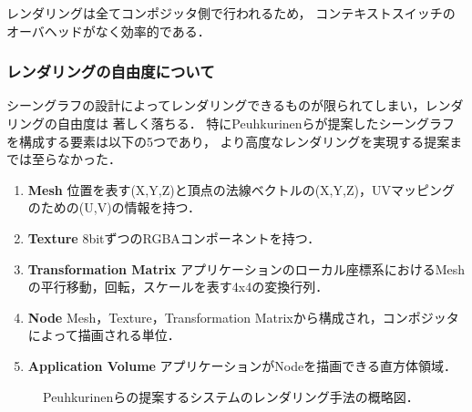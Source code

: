レンダリングは全てコンポジッタ側で行われるため，
コンテキストスイッチのオーバヘッドがなく効率的である．

\subsubsection*{レンダリングの自由度について}

シーングラフの設計によってレンダリングできるものが限られてしまい，レンダリングの自由度は
著しく落ちる．
特にPeuhkurinenらが提案したシーングラフを構成する要素は以下の5つであり，
より高度なレンダリングを実現する提案までは至らなかった．

\begin{enumerate}
  \item \textbf{Mesh}
        位置を表す(X,Y,Z)と頂点の法線ベクトルの(X,Y,Z)，UVマッピングのための(U,V)の情報を持つ．
  \item \textbf{Texture}
        8bitずつのRGBAコンポーネントを持つ．
  \item \textbf{Transformation Matrix}
        アプリケーションのローカル座標系におけるMeshの平行移動，回転，スケールを表す4x4の変換行列．
  \item \textbf{Node}
        Mesh，Texture，Transformation Matrixから構成され，コンポジッタによって描画される単位．
  \item \textbf{Application Volume}
        アプリケーションがNodeを描画できる直方体領域．
\end{enumerate}

\begin{figure}[htbp]
  \centering
  \caption{
    Peuhkurinenら\cite{peuhkurinen}の提案するシステムのレンダリング手法の概略図．
  }
  \label{fig:peuhkurinen-rendering}
\end{figure}


